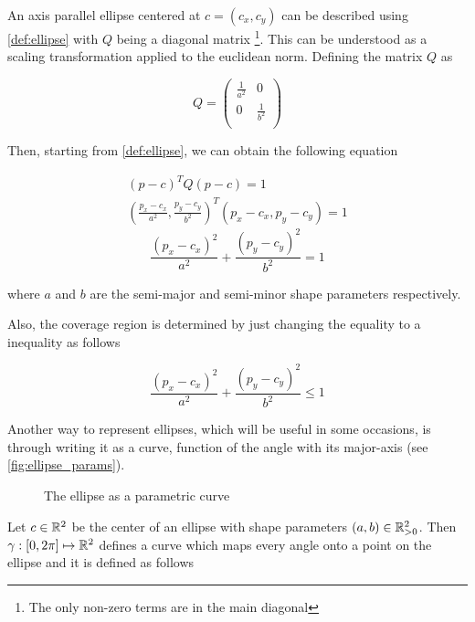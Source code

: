 An axis parallel ellipse centered at $c = (c_x,c_y)$ can be described using \autoref{def:ellipse} with $Q$ being a diagonal matrix \footnote{The only non-zero terms are in the main diagonal}. This can be understood as a scaling transformation applied to the euclidean norm.
Defining the matrix $Q$ as

\[
Q=
\left( {\begin{array}{cc}
    \frac{1}{a^2} & 0 \\
    0 & \frac{1}{b^2} \\
    \end{array} } \right)
\]

Then, starting from \autoref{def:ellipse}, we can obtain the following equation

\begin{align*}
        (p-c)^{T}Q(p-c) = 1\\
    (\frac{p_x-c_x}{a^2}, \frac{p_y-c_y}{b^2})^{T}(p_x-c_x, p_y-c_y) = 1
 \end{align*}
 \begin{equation}\label{equation:pellipse}
  \frac{(p_x-c_x)^2}{a^2} + \frac{(p_y-c_y)^2}{b^2} = 1
 \end{equation}

where $a$ and $b$ are the semi-major and semi-minor shape parameters respectively.

Also, the coverage region is determined by just changing the equality to a inequality as follows

\begin{equation}\label{equation:cover_pellipse}
\frac{(p_x-c_x)^2}{a^2} + \frac{(p_y-c_y)^2}{b^2} \le 1
\end{equation}

Another way to represent ellipses, which will be useful in some occasions, is through writing it as a curve, function of the angle with its major-axis (see \autoref{fig:ellipse_params}).

\begin{figure}[H]
    \centering
    
    \caption{The ellipse as a parametric curve}
    
    \fautor
    \label{fig:ellipse_params}
\end{figure}

Let $c \in \mathbb{R}^2$ be the center of an ellipse with shape parameters $(a,b) \in \mathbb{R}^2_{>0}$. Then $\gamma : [0, 2\pi] \mapsto \mathbb{R}^2$ defines a curve which maps every angle onto a point on the ellipse and it is defined as follows

